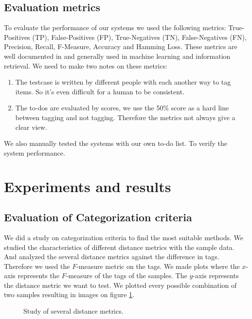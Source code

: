 \documentclass[a4paper,titlepage]{article}
\begin{document}
\subsection{Evaluation metrics}
To evaluate the performance of our systems we used the following metrics: True-Positives (TP), False-Positives (FP), True-Negatives (TN), False-Negatives (FN), Precision, Recall, F-Measure, Accuracy and Hamming Loss. These metrics are well documented in \cite{Francis99performancemeasures} and generally used in machine learning and information retrieval. We need to make two notes on these metrics:
\begin{enumerate}
 \item The testcase is written by different people with each another way to tag items. So it's even difficult for a human to be consistent.
 \item The to-dos are evaluated by scores, we use the 50\% score as a hard line between tagging and not tagging. Therefore the metrics not always give a clear view.
\end{enumerate}
We also manually tested the systems with our own to-do list. To verify the system performance.
\section{Experiments and results}
\subsection{Evaluation of Categorization criteria}
We did a study on categorization criteria to find the most suitable methods. We studied the characteristics of different distance metrics with the sample data. And analyzed the several distance metrics against the difference in tags. Therefore we used the $F$-measure metric on the tags. We made plots where the $x$-axis represents the $F$-measure of the tags of the samples. The $y$-axis represents the distance metric we want to test. We plotted every possible combination of two samples resulting in images on figure \ref{fig:metricStudy}.
\begin{figure}
\centering
{}
\caption{Study of several distance metrics.}
\label{fig:metricStudy}
\end{figure}
\end{document}
